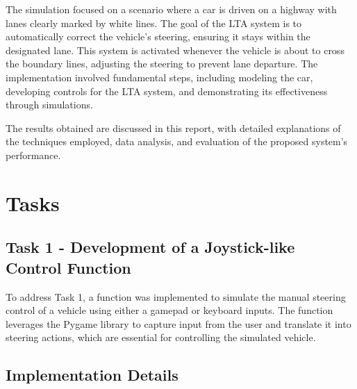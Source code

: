 \documentclass[12pt]{article}
\begin{document}
The simulation focused on a scenario where a car is driven on a highway with lanes clearly marked by white lines. The goal of the LTA system is to automatically correct the vehicle's steering, ensuring it stays within the designated lane. This system is activated whenever the vehicle is about to cross the boundary lines, adjusting the steering to prevent lane departure. The implementation involved fundamental steps, including modeling the car, developing controls for the LTA system, and demonstrating its effectiveness through simulations.

The results obtained are discussed in this report, with detailed explanations of the techniques employed, data analysis, and evaluation of the proposed system's performance.

\newpage

\section{Tasks}

\subsection{Task 1 - Development of a Joystick-like Control Function}

To address Task 1, a function was implemented to simulate the manual steering control of a vehicle using either a gamepad or keyboard inputs. The function leverages the Pygame library to capture input from the user and translate it into steering actions, which are essential for controlling the simulated vehicle.

\subsection*{Implementation Details}
\end{document}
